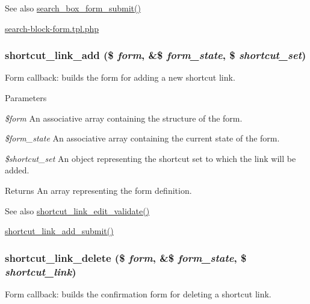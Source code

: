 \begin{DoxySeeAlso}{See also}
\hyperlink{group__search_gaf91fe848f7f58fc3d63001198e485e00}{search\_\-box\_\-form\_\-submit()} 

\hyperlink{search-block-form_8tpl_8php}{search-\/block-\/form.tpl.php} 
\end{DoxySeeAlso}
\hypertarget{group__forms_ga7d6281f92a029c89b4e72756e5f44859}{
\subsubsection[{shortcut\_\-link\_\-add}]{\setlength{\rightskip}{0pt plus 5cm}shortcut\_\-link\_\-add (\$ {\em form}, \/  \&\$ {\em form\_\-state}, \/  \$ {\em shortcut\_\-set})}}
\label{group__forms_ga7d6281f92a029c89b4e72756e5f44859}
Form callback: builds the form for adding a new shortcut link.


\begin{DoxyParams}{Parameters}
\item[{\em \$form}]An associative array containing the structure of the form. \item[{\em \$form\_\-state}]An associative array containing the current state of the form. \item[{\em \$shortcut\_\-set}]An object representing the shortcut set to which the link will be added.\end{DoxyParams}
\begin{DoxyReturn}{Returns}
An array representing the form definition.
\end{DoxyReturn}
\begin{DoxySeeAlso}{See also}
\hyperlink{shortcut_8admin_8inc_a91ed3ef518afe23ce152c277dc7b99cc}{shortcut\_\-link\_\-edit\_\-validate()} 

\hyperlink{shortcut_8admin_8inc_a1fca45432bd8b965324d87062eabf5cd}{shortcut\_\-link\_\-add\_\-submit()} 
\end{DoxySeeAlso}
\hypertarget{group__forms_ga5a806d89748b578557dbc88fcf0af232}{
\subsubsection[{shortcut\_\-link\_\-delete}]{\setlength{\rightskip}{0pt plus 5cm}shortcut\_\-link\_\-delete (\$ {\em form}, \/  \&\$ {\em form\_\-state}, \/  \$ {\em shortcut\_\-link})}}
\label{group__forms_ga5a806d89748b578557dbc88fcf0af232}
Form callback: builds the confirmation form for deleting a shortcut link.


